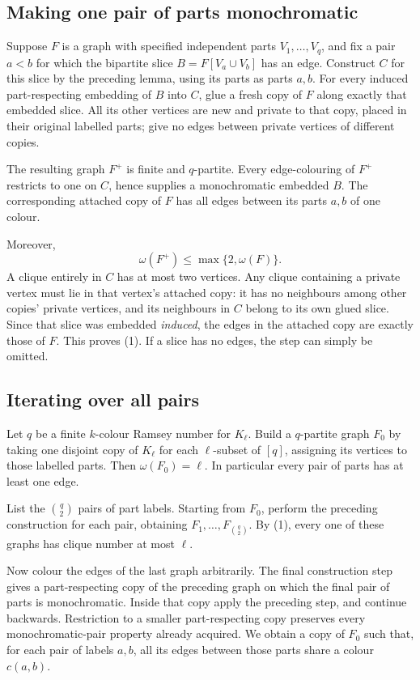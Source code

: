 \subsection*{Making one pair of parts monochromatic}
Suppose \(F\) is a graph with specified independent parts \(V_1,\ldots,V_q\), and fix a pair \(a<b\) for which the bipartite slice \(B=F[V_a\cup V_b]\) has an edge.
Construct \(C\) for this slice by the preceding lemma, using its parts as parts \(a,b\).
For every induced part-respecting embedding of \(B\) into \(C\), glue a fresh copy of \(F\) along exactly that embedded slice. All its other vertices are new and private to that copy, placed in their original labelled parts; give no edges between private vertices of different copies.

The resulting graph \(F^+\) is finite and \(q\)-partite. Every edge-colouring of \(F^+\) restricts to one on \(C\), hence supplies a monochromatic embedded \(B\). The corresponding attached copy of \(F\) has all edges between its parts \(a,b\) of one colour.

Moreover,
\[
\omega(F^+)\leq\max\{2,\omega(F)\}. \tag{1}
\]
A clique entirely in \(C\) has at most two vertices. Any clique containing a private vertex must lie in that vertex's attached copy: it has no neighbours among other copies' private vertices, and its neighbours in \(C\) belong to its own glued slice. Since that slice was embedded \emph{induced}, the edges in the attached copy are exactly those of \(F\). This proves (1). If a slice has no edges, the step can simply be omitted.

\subsection*{Iterating over all pairs}
Let \(q\) be a finite \(k\)-colour Ramsey number for \(K_\ell\). Build a \(q\)-partite graph \(F_0\) by taking one disjoint copy of \(K_\ell\) for each \(\ell\)-subset of \([q]\), assigning its vertices to those labelled parts.
Then \(\omega(F_0)=\ell\). In particular every pair of parts has at least one edge.

List the \(\binom q2\) pairs of part labels. Starting from \(F_0\), perform the preceding construction for each pair, obtaining \(F_1,\ldots,F_{\binom q2}\).
By (1), every one of these graphs has clique number at most \(\ell\).

Now colour the edges of the last graph arbitrarily. The final construction step gives a part-respecting copy of the preceding graph on which the final pair of parts is monochromatic. Inside that copy apply the preceding step, and continue backwards. Restriction to a smaller part-respecting copy preserves every monochromatic-pair property already acquired.
We obtain a copy of \(F_0\) such that, for each pair of labels \(a,b\), all its edges between those parts share a colour \(c(a,b)\).

